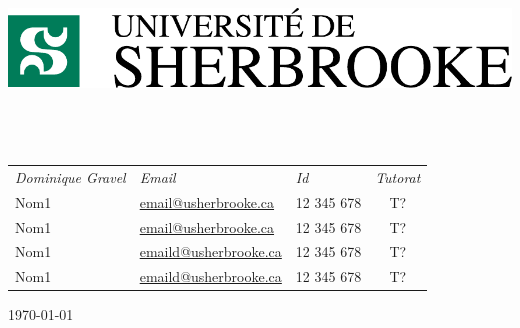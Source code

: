\begin{titlepage}
\begin{center}

\includegraphics[scale=0.9]{img/udes_logo}\\
\vspace{0.5cm}
\textsc{\normalsize\faculte}\\[1.2cm]

\HRule\\[0.4cm]
{\huge\bfseries\doctitle}
\HRule\\[1.5cm]

\begin{tabulary}{\textwidth}{L L L C}
  \large\emph{Dominique Gravel} &
  \large\emph{Email} &
  \large\emph{Id} &
  \large\emph{Tutorat} \\[0.5cm]
  Nom1 & \href{mailto:email@usherbrooke.ca}{email@usherbrooke.ca} & 12 345 678 & T? \\
  Nom1 & \href{mailto:email@usherbrooke.ca}{email@usherbrooke.ca} & 12 345 678 & T? \\
  Nom1 & \href{mailto:email@usherbrooke.ca}{emaild@usherbrooke.ca} & 12 345 678 & T? \\
  Nom1 & \href{mailto:email@usherbrooke.ca}{emaild@usherbrooke.ca} & 12 345 678 & T? \\
\end{tabulary}

\vfill

{\large \today}

\end{center}
\end{titlepage}
